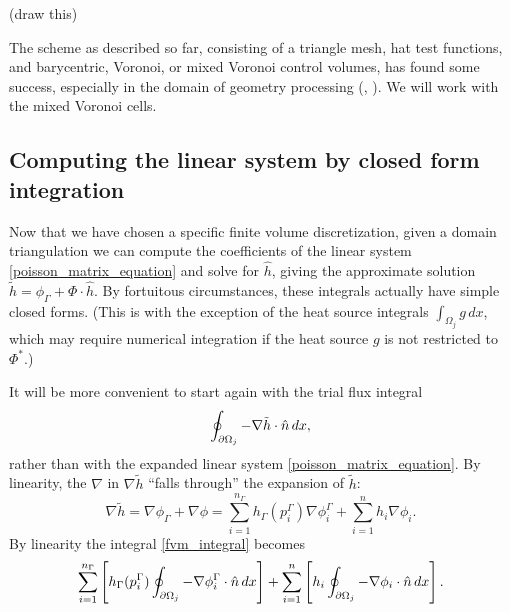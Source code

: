 \vskip 0.2in
(draw this)
\vskip 0.2in

The scheme as described so far, consisting of a triangle mesh, hat test functions, and barycentric, Voronoi, or mixed Voronoi control volumes,
has found some success, especially in the domain of geometry processing (\cite{polygon_mesh_processing}, \cite{ddg_triangulated}).
We will work with the mixed Voronoi cells.

\subsection{Computing the linear system by closed form integration}\label{fvm_closed_form}
Now that we have chosen a specific finite volume discretization, given a domain triangulation we can compute
the coefficients of the linear system \eqref{poisson_matrix_equation} and solve for $\hat{h}$, giving
the approximate solution $\tilde{h} = \phi_\Gamma + \Phi\cdot \hat{h}$.
By fortuitous circumstances, these integrals actually have simple closed forms.
(This is with the exception of the heat source integrals $\int_{\Omega_j}g\,dx$,
which may require numerical integration if the heat source $g$ is not restricted to $\Phi^*$.)

It will be more convenient to start again with the trial flux integral
\newcommand{\fvmintegral}{
\oint_{\pom_j} -\nabla \tilde{h}\cdot\hat{n}\,dx
}
\begin{equation}\label{fvm_integral}
\fvmintegral,
\end{equation}
rather than with the expanded linear system \eqref{poisson_matrix_equation}.
By linearity, the $\nabla$ in $\nabla\tilde{h}$ ``falls through'' the expansion of $\tilde{h}$:
\begin{equation}\label{gradient_expansion}
    \nabla \tilde{h} = \nabla\phi_\Gamma + \nabla\phi
             = \sum_{i=1}^{n_\Gamma}h_\Gamma(p^\Gamma_i)\nabla\phi^\Gamma_i + \sum_{i=1}^n h_i\nabla\phi_i.
\end{equation}
By linearity the integral \eqref{fvm_integral} becomes
\begin{equation}\label{fvm_integral_linearity_expanded}
    \sum_{i=1}^{n_\Gamma}\left[h_\Gamma(p^\Gamma_i)\oint_{{\partial\Omega}_j}-\nabla\phi^\Gamma_i\cdot\hat{n}\,dx\right]
    + \sum_{i=1}^n\left[h_i\oint_{{\partial\Omega}_j}-\nabla\phi_i\cdot\hat{n}\,dx\right].
\end{equation}

